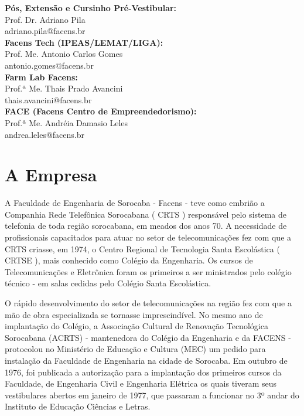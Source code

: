 \documentclass[
	12pt,				%
	oneside,			%
	a4paper,			%
	chapter=TITLE,		%
	section=TITLE,		%
	sumario=tradicional %
	english,			%
	french,				%
	spanish,			%
	brazil				%
	]{abntex2}
\begin{document}
\textbf{Pós, Extensão e Cursinho Pré-Vestibular:} \\ \indent Prof. Dr. Adriano Pila \\
\indent adriano.pila@facens.br \\

\textbf{Facens Tech (IPEAS/LEMAT/LIGA):} \\ \indent Prof. Me. Antonio Carlos Gomes \\
\indent antonio.gomes@facens.br \\

\textbf{Farm Lab Facens:} \\ \indent Prof.ª Me. Thais Prado Avancini \\
\indent thais.avancini@facens.br \\

\textbf{FACE (Facens Centro de Empreendedorismo):} \\ \indent Prof.ª Me. Andréia Damasio Leles \\
\indent andrea.leles@facens.br

\section{A Empresa}
\label{sec:aempresa}
A Faculdade de Engenharia de Sorocaba - Facens - teve como embrião a Companhia Rede Telefônica Sorocabana ( CRTS ) responsável pelo sistema de telefonia de toda região sorocabana, em meados dos anos 70. A necessidade de profissionais capacitados para atuar no setor de telecomunicações fez com que a CRTS criasse, em 1974, o Centro Regional de Tecnologia Santa Escolástica ( CRTSE ), mais conhecido como Colégio da Engenharia. Os cursos de Telecomunicações e Eletrônica foram os primeiros a ser ministrados pelo colégio técnico - em salas cedidas pelo Colégio Santa Escolástica.

O rápido desenvolvimento do setor de telecomunicações na região fez com que a mão de obra especializada se tornasse imprescindível. No mesmo ano de implantação do Colégio, a Associação Cultural de Renovação Tecnológica Sorocabana (ACRTS) - mantenedora do Colégio da Engenharia e da FACENS - protocolou no Ministério de Educação e Cultura (MEC) um pedido para instalação da Faculdade de Engenharia na cidade de Sorocaba. Em outubro de 1976, foi publicada a autorização para a implantação dos primeiros cursos da Faculdade, de Engenharia Civil e Engenharia Elétrica os quais tiveram seus vestibulares abertos em janeiro de 1977, que passaram a funcionar no 3º andar do Instituto de Educação Ciências e Letras.
\end{document}
